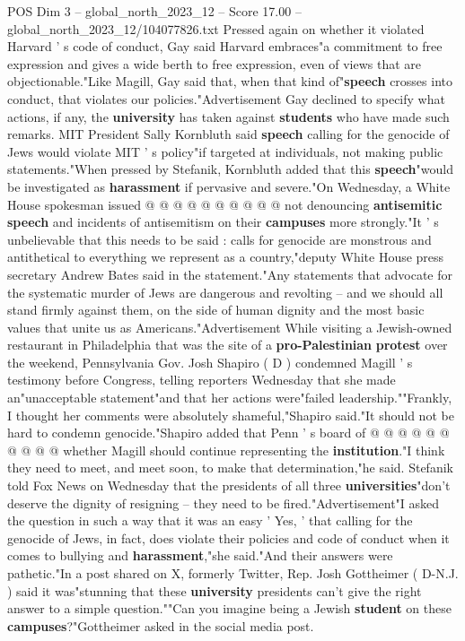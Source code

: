 \begin{textsample}{POS Dim 3 – global\_north\_2023\_12 – Score 17.00 – global\_north\_2023\_12/104077826.txt}
Pressed again on whether it violated Harvard ' s code of conduct, Gay said Harvard embraces"a commitment to free expression and gives a wide berth to free expression, even of views that are objectionable."Like Magill, Gay said that, when that kind of"\textbf{speech} crosses into conduct, that violates our policies."Advertisement Gay declined to specify what actions, if any, the \textbf{university} has taken against \textbf{students} who have made such remarks.
MIT President Sally Kornbluth said \textbf{speech} calling for the genocide of Jews would violate MIT ' s policy"if targeted at individuals, not making public statements."When pressed by Stefanik, Kornbluth added that this \textbf{speech}"would be investigated as \textbf{harassment} if pervasive and severe."On Wednesday, a White House spokesman issued @ @ @ @ @ @ @ @ @ @ not denouncing \textbf{antisemitic} \textbf{speech} and incidents of antisemitism on their \textbf{campuses} more strongly."It ' s unbelievable that this needs to be said : calls for genocide are monstrous and antithetical to everything we represent as a country,"deputy White House press secretary Andrew Bates said in the statement."Any statements that advocate for the systematic murder of Jews are dangerous and revolting -- and we should all stand firmly against them, on the side of human dignity and the most basic values that unite us as Americans."Advertisement While visiting a Jewish-owned restaurant in Philadelphia that was the site of a \textbf{pro-Palestinian} \textbf{protest} over the weekend, Pennsylvania Gov.
Josh Shapiro ( D ) condemned Magill ' s testimony before Congress, telling reporters Wednesday that she made an"unacceptable statement"and that her actions were"failed leadership.""Frankly, I thought her comments were absolutely shameful,"Shapiro said."It should not be hard to condemn genocide."Shapiro added that Penn ' s board of @ @ @ @ @ @ @ @ @ @ whether Magill should continue representing the \textbf{institution}."I think they need to meet, and meet soon, to make that determination,"he said.
Stefanik told Fox News on Wednesday that the presidents of all three \textbf{universities}"don't deserve the dignity of resigning -- they need to be fired."Advertisement"I asked the question in such a way that it was an easy ' Yes, ' that calling for the genocide of Jews, in fact, does violate their policies and code of conduct when it comes to bullying and \textbf{harassment},"she said."And their answers were pathetic."In a post shared on X, formerly Twitter, Rep.
Josh Gottheimer ( D-N.J. ) said it was"stunning that these \textbf{university} presidents can't give the right answer to a simple question.""Can you imagine being a Jewish \textbf{student} on these \textbf{campuses}?"Gottheimer asked in the social media post.

\end{textsample}

